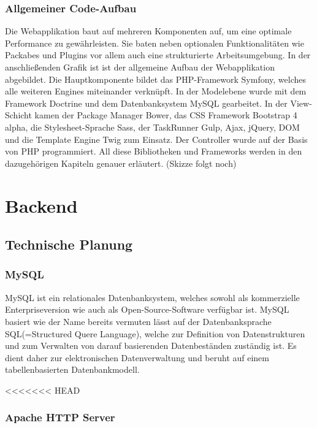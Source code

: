    \subsubsection{Allgemeiner Code-Aufbau}
    
Die Webapplikation baut auf mehreren Komponenten auf, um eine optimale Performance zu gewährleisten. Sie baten neben optionalen Funktionalitäten wie Packabes und Plugins vor allem auch eine strukturierte Arbeitsumgebung.
In der anschließenden Grafik ist ist der allgemeine Aufbau der Webapplikation abgebildet. Die Hauptkomponente bildet das PHP-Framework Symfony, welches alle weiteren Engines miteinander verknüpft. In der Modelebene wurde mit dem Framework Doctrine und dem Datenbanksystem MySQL gearbeitet. In der View-Schicht kamen der Package Manager Bower, das CSS Framework Bootstrap 4 alpha, die Stylesheet-Sprache Sass, der TaskRunner Gulp, Ajax, jQuery, DOM und die Template Engine Twig zum Einsatz. Der Controller wurde auf der Basis von PHP programmiert. All diese Bibliotheken und Frameworks werden in den dazugehörigen Kapiteln genauer erläutert.
(Skizze folgt noch)

\section{Backend}

  \subsection{Technische Planung}

    \subsubsection{MySQL}

MySQL ist ein relationales Datenbanksystem, welches sowohl als kommerzielle Enterpriseversion wie auch als Open-Source-Software verfügbar ist. MySQL basiert wie der Name bereits vermuten lässt auf der Datenbanksprache SQL(=Structured Quere Language), welche zur Definition von Datenstrukturen und zum Verwalten von darauf basierenden Datenbeständen zuständig ist. Es dient daher zur elektronischen Datenverwaltung und beruht auf einem tabellenbasierten Datenbankmodell.

<<<<<<< HEAD
    \subsubsection{Apache HTTP Server}

